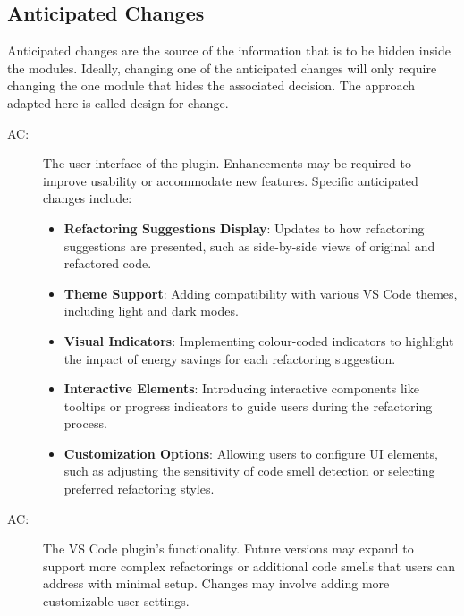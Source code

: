 \documentclass[12pt, titlepage]{article}
\newcounter{acnum}
\newcommand{\actheacnum}{AC\theacnum}
\begin{document}
\subsection{Anticipated Changes} \label{SecAchange}

Anticipated changes are the source of the information that is to be hidden
inside the modules. Ideally, changing one of the anticipated changes will only
require changing the one module that hides the associated decision. The approach
adapted here is called design for
change.

\begin{description}
  \item[ \actheacnum \label{acUserInterface}:] The user interface of the plugin. Enhancements may be required to improve usability or accommodate new features. Specific anticipated changes include:
      \begin{itemize}
          \item \textbf{Refactoring Suggestions Display}: Updates to how refactoring suggestions are presented, such as side-by-side views of original and refactored code.
          \item \textbf{Theme Support}: Adding compatibility with various VS Code themes, including light and dark modes.
          \item \textbf{Visual Indicators}: Implementing colour-coded indicators to highlight the impact of energy savings for each refactoring suggestion.
          \item \textbf{Interactive Elements}: Introducing interactive components like tooltips or progress indicators to guide users during the refactoring process.
          \item \textbf{Customization Options}: Allowing users to configure UI elements, such as adjusting the sensitivity of code smell detection or selecting preferred refactoring styles.
      \end{itemize}
  
  \item[ \actheacnum \label{acVSCodePlugin}:] The VS Code plugin's
    functionality. Future versions may expand to support more complex refactorings
    or additional code smells that users can address with minimal setup. Changes
    may involve adding more customizable user settings.
    

\end{description}
\end{document}
